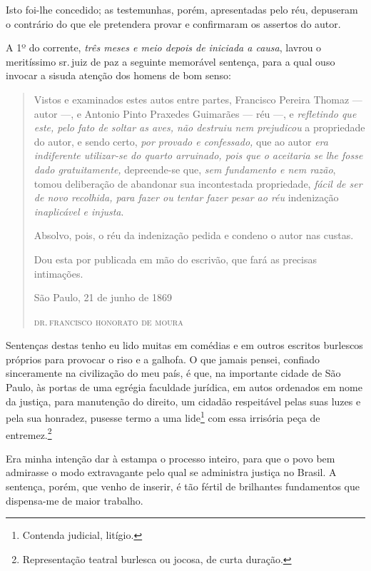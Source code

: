 Isto foi-lhe concedido; as testemunhas, porém, apresentadas pelo réu,
depuseram o contrário do que ele pretendera provar e confirmaram os
assertos do autor.

A 1º do corrente, \emph{três meses e meio depois de iniciada a causa},
lavrou o meritíssimo sr.\,juiz de paz a seguinte memorável sentença, para
a qual ouso invocar a sisuda atenção dos homens de bom senso:


\begin{quote}
Vistos e examinados estes autos entre partes, Francisco Pereira Thomaz
--- autor ---, e Antonio Pinto Praxedes Guimarães --- réu ---, e
\emph{refletindo que este, pelo fato de soltar as aves, não destruiu nem
prejudicou} a propriedade do autor, e sendo certo, \emph{por provado e
confessado,} que ao autor \emph{era indiferente utilizar-se do quarto
arruinado, pois que o aceitaria se lhe fosse dado gratuitamente,}
depreende-se que, \emph{sem fundamento e nem razão}, tomou deliberação
de abandonar sua incontestada propriedade, \emph{fácil de ser de novo
recolhida, para fazer ou tentar fazer pesar ao réu} indenização
\emph{inaplicável e injusta}.

Absolvo, pois, o réu da indenização pedida e condeno o autor nas custas.

Dou esta por publicada em mão do escrivão, que fará as precisas
intimações.

\begin{flushright}
São Paulo, 21 de junho de 1869

\textsc{dr.\,francisco honorato de moura}
\end{flushright}
\end{quote}

Sentenças destas tenho eu lido muitas em comédias e em outros escritos
burlescos próprios para provocar o riso e a galhofa. O que jamais
pensei, confiado sinceramente na civilização do meu país, é que, na
importante cidade de São Paulo, às portas de uma egrégia faculdade
jurídica, em autos ordenados em nome da justiça, para manutenção do
direito, um cidadão respeitável pelas suas luzes e pela sua honradez,
pusesse termo a uma lide\footnote{Contenda judicial, litígio.} com
essa irrisória peça de entremez.\footnote{Representação teatral
  burlesca ou jocosa, de curta duração.}

Era minha intenção dar à estampa o processo inteiro, para que o povo bem
admirasse o modo extravagante pelo qual se administra justiça no Brasil.
A sentença, porém, que venho de inserir, é tão fértil de brilhantes
fundamentos que dispensa-me de maior trabalho.


